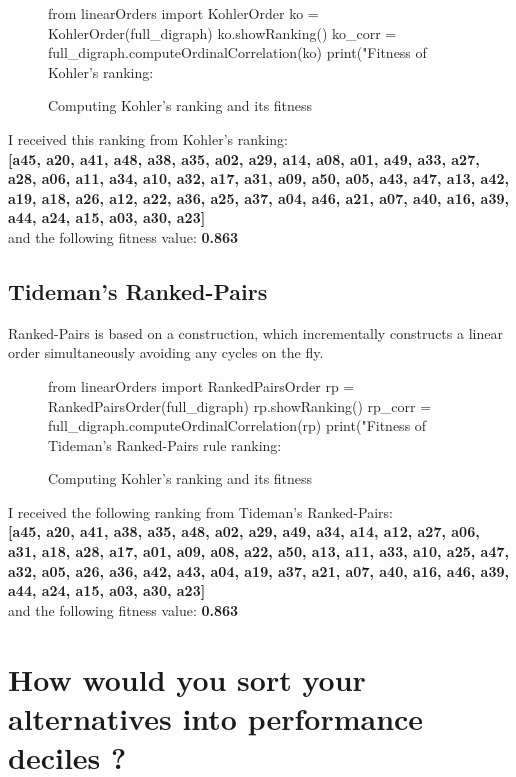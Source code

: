 \documentclass[a4paper]{article}
\begin{document}
\begin{figure}[H]
	\begin{center}
		\begin{python}
from linearOrders import KohlerOrder
ko = KohlerOrder(full_digraph)
ko.showRanking()
ko_corr = full_digraph.computeOrdinalCorrelation(ko)
print("Fitness of Kohler's ranking: %
		\end{python}
	\end{center}
	\caption{Computing Kohler's ranking and its fitness}
	\label{lst:kohler}
\end{figure}

I received this ranking from Kohler's ranking:\\

\textbf{[a45, a20, a41, a48, a38, a35, a02, a29, a14, a08, a01, a49, a33, a27, a28, a06, a11, a34, a10, a32, a17, a31, a09, a50, a05, a43, a47, a13, a42, a19, a18, a26, a12, a22, a36, a25, a37, a04, a46, a21, a07, a40, a16, a39, a44, a24, a15, a03, a30, a23]}\\

and the following fitness value: \textbf{0.863}

\subsection{Tideman's Ranked-Pairs}

Ranked-Pairs is based on a construction, which incrementally constructs a linear order simultaneously avoiding any cycles on the fly.

\begin{figure}[H]
	\begin{center}
		\begin{python}
from linearOrders import RankedPairsOrder
rp = RankedPairsOrder(full_digraph)
rp.showRanking()
rp_corr = full_digraph.computeOrdinalCorrelation(rp)
print("Fitness of Tideman's Ranked-Pairs rule ranking: %

		\end{python}
	\end{center}
	\caption{Computing Kohler's ranking and its fitness}
	\label{lst:kohler}
\end{figure}


I received the following ranking from Tideman's Ranked-Pairs:\\

\textbf{[a45, a20, a41, a38, a35, a48, a02, a29, a49, a34, a14, a12, a27, a06, a31, a18, a28, a17, a01, a09, a08, a22, a50, a13, a11, a33, a10, a25, a47, a32, a05, a26, a36, a42, a43, a04, a19, a37, a21, a07, a40, a16, a46, a39, a44, a24, a15, a03, a30, a23]}\\

and the following fitness value: \textbf{0.863}

\section{How would you sort your alternatives into performance deciles ? }



\printbibliography
\end{document}

